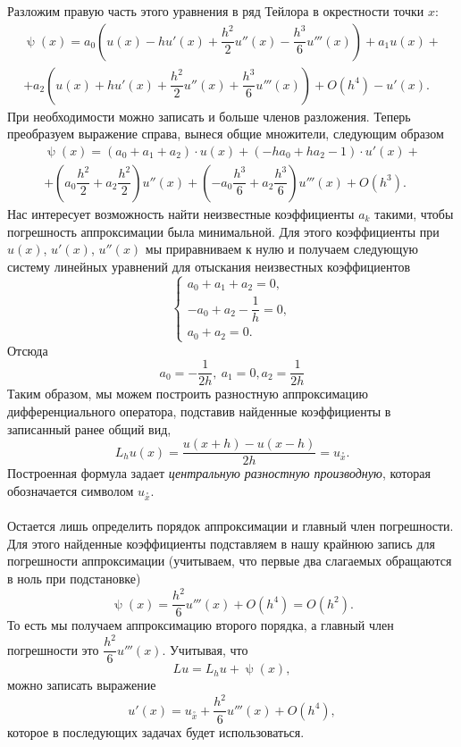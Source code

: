 \documentclass[a4paper, 12pt]{article}
\renewcommand{\psi}{\uppsi}
\begin{document}
\begin{enumerate}
\begin{enumerate}
			Разложим правую часть этого уравнения в ряд Тейлора в окрестности точки $x$:
			\begin{multline*}
				\psi(x) = a_0 \left(u(x) - h u'(x) + \dfrac{h^2}{2}u''(x) - \dfrac{h^3}{6}u'''(x)  \right) + a_1 u(x) +\\+ a_2\left(u(x) + h u'(x) + \dfrac{h^2}{2}u''(x) + \dfrac{h^3}{6}u'''(x)  \right) + O(h^4) - u'(x) .
			\end{multline*}
			При необходимости можно записать и больше членов разложения. Теперь преобразуем выражение справа, вынеся общие множители, следующим образом
			\begin{multline*}
				\psi(x) = (a_0 + a_1+a_2)\cdot u(x) + (-ha_0 +ha_2 -1 )\cdot  u'(x) +\\+ \left(a_0\dfrac{h^2}{2} + a_2\dfrac{h^2}{2}\right)u''(x)+\left(-a_0\dfrac{h^3}{6} + a_2\dfrac{h^3}{6}\right)u'''(x) +O(h^3).
			\end{multline*}
			Нас интересует возможность найти неизвестные коэффициенты $a_k$ такими, чтобы погрешность аппроксимации была минимальной. Для этого коэффициенты при $u(x)$, $u'(x)$, $u''(x)$ мы приравниваем к нулю и получаем следующую систему линейных уравнений для отыскания неизвестных коэффициентов 
			$$\begin{cases}
				a_0 + a_1+a_2= 0,\\
				-a_0  +a_2 - \dfrac1h= 0,\\
				a_0 + a_2 = 0.
			\end{cases}$$
			Отсюда
			$$a_0 = -\dfrac{1}{2h},\ a_1 = 0, a_2 = \dfrac{1}{2h}$$
			Таким образом, мы можем построить разностную аппроксимацию дифференциального оператора, подставив найденные коэффициенты в записанный ранее общий вид,
			$$L_h u(x) = \dfrac{u(x+h)  - u(x-h)}{2h} = u_{\overset{\circ}{ x}}.$$
			Построенная формула задает \textit{центральную разностную производную}, которая обозначается символом $u_{\overset{\circ}{ x}}$.\\\\ 
			Остается лишь определить порядок аппроксимации и главный член погрешности. Для этого найденные коэффициенты подставляем в нашу крайнюю запись для погрешности аппроксимации (учитываем, что первые два слагаемых обращаются в ноль при подстановке)
			$$
			\psi(x) = \dfrac{h^2}6 u'''(x) + O(h^4) = O(h^2).
			$$
			То есть мы получаем аппроксимацию второго порядка, а главный член погрешности это $\dfrac{h^2}6 u'''(x)$.
			Учитывая, что $$Lu = L_hu + \psi(x),$$
			можно записать выражение
			$$u'(x) = u_{\overset{\circ}{ x}} + \dfrac{h^2}6 u'''(x) + O(h^4),$$
			которое в последующих задачах будет использоваться.

\end{enumerate}
\end{enumerate}
\end{document}
